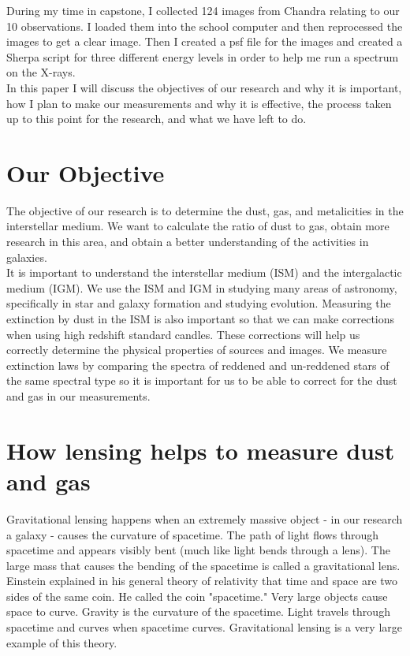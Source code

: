 \documentclass[12pt]{report}
\begin{document}
During my time in capstone, I collected 124 images from Chandra relating to our 10 observations. I loaded them into the school computer and then reprocessed the images to get a clear image. Then I created a psf file for the images and created a Sherpa script for three different energy levels in order to help me run a spectrum on the X-rays.\\

In this paper I will discuss the objectives of our research and why it is important, how I plan to make our measurements and why it is effective, the process taken up to this point for the research, and what we have left to do.


\chapter{Our Objective}
The objective of our research is to determine the dust, gas, and metalicities in the interstellar medium. We want to calculate the ratio of dust to gas, obtain more research in this area, and obtain a better understanding of the activities in galaxies.\\

It is important to understand the interstellar medium (ISM) and the intergalactic medium (IGM). We use the ISM and IGM in studying many areas of astronomy, specifically in star and galaxy formation and studying evolution. Measuring the extinction by dust in the ISM is also important so that we can make corrections when using high redshift standard candles. These corrections will help us correctly determine the physical properties of sources and images. We measure extinction laws by comparing the spectra of reddened and un-reddened stars of the same spectral type so it is important for us to be able to correct for the dust and gas in our measurements.


\chapter{How lensing helps to measure dust and gas}
Gravitational lensing happens when an extremely massive object - in our research a galaxy - causes the curvature of spacetime. The path of light flows through spacetime and appears visibly bent (much like light bends through a lens). The large mass that causes the bending of the spacetime is called a gravitational lens.\cite{Information@eso.org_2020}\\

Einstein explained in his general theory of relativity that time and space are two sides of the same coin. He called the coin "spacetime." Very large objects cause space to curve. Gravity is the curvature of the spacetime. Light travels through spacetime and curves when spacetime curves. Gravitational lensing is a very large example of this theory\cite{Information@eso.org_2020}.
\end{document}
